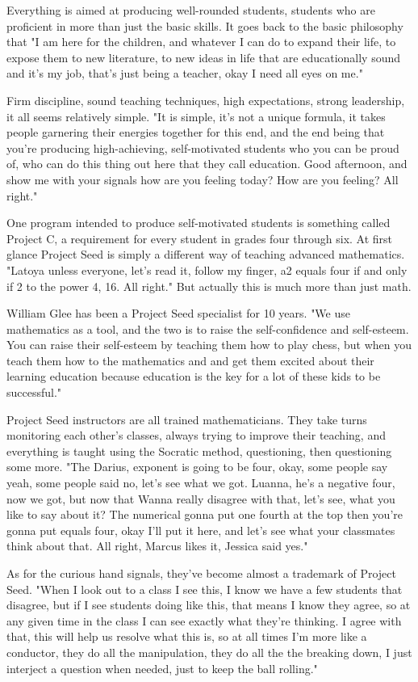 Everything is aimed at producing well-rounded students, students who are proficient in more than just the basic skills. It goes back to the basic philosophy that "I am here for the children, and whatever I can do to expand their life, to expose them to new literature, to new ideas in life that are educationally sound and it's my job, that's just being a teacher, okay I need all eyes on me."

Firm discipline, sound teaching techniques, high expectations, strong leadership, it all seems relatively simple. "It is simple, it's not a unique formula, it takes people garnering their energies together for this end, and the end being that you're producing high-achieving, self-motivated students who you can be proud of, who can do this thing out here that they call education. Good afternoon, and show me with your signals how are you feeling today? How are you feeling? All right."

One program intended to produce self-motivated students is something called Project C, a requirement for every student in grades four through six. At first glance Project Seed is simply a different way of teaching advanced mathematics. "Latoya unless everyone, let's read it, follow my finger, a2 equals four if and only if 2 to the power 4, 16. All right." But actually this is much more than just math.

William Glee has been a Project Seed specialist for 10 years. "We use mathematics as a tool, and the two is to raise the self-confidence and self-esteem. You can raise their self-esteem by teaching them how to play chess, but when you teach them how to the mathematics and and get them excited about their learning education because education is the key for a lot of these kids to be successful."

Project Seed instructors are all trained mathematicians. They take turns monitoring each other's classes, always trying to improve their teaching, and everything is taught using the Socratic method, questioning, then questioning some more. "The Darius, exponent is going to be four, okay, some people say yeah, some people said no, let's see what we got. Luanna, he's a negative four, now we got, but now that Wanna really disagree with that, let's see, what you like to say about it? The numerical gonna put one fourth at the top then you're gonna put equals four, okay I'll put it here, and let's see what your classmates think about that. All right, Marcus likes it, Jessica said yes."

As for the curious hand signals, they've become almost a trademark of Project Seed. "When I look out to a class I see this, I know we have a few students that disagree, but if I see students doing like this, that means I know they agree, so at any given time in the class I can see exactly what they're thinking. I agree with that, this will help us resolve what this is, so at all times I'm more like a conductor, they do all the manipulation, they do all the the breaking down, I just interject a question when needed, just to keep the ball rolling."

